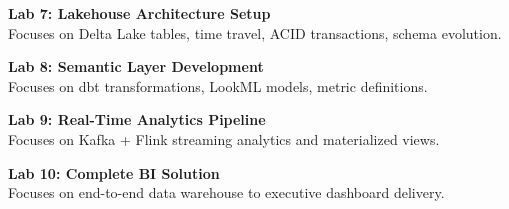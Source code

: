 \noindent\textbf{Lab 7: Lakehouse Architecture Setup} \\
Focuses on Delta Lake tables, time travel, ACID transactions, schema evolution.

\vspace{0.2cm}

\noindent\textbf{Lab 8: Semantic Layer Development} \\
Focuses on dbt transformations, LookML models, metric definitions.

\vspace{0.2cm}

\noindent\textbf{Lab 9: Real-Time Analytics Pipeline} \\
Focuses on Kafka + Flink streaming analytics and materialized views.

\vspace{0.2cm}

\noindent\textbf{Lab 10: Complete BI Solution} \\
Focuses on end-to-end data warehouse to executive dashboard delivery.

\vspace{0.2cm}

\newpage
{}

